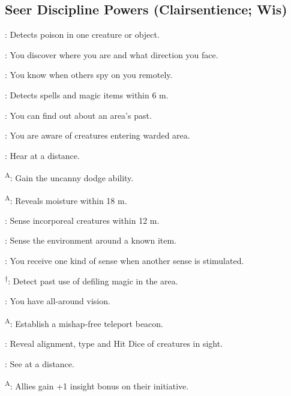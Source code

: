 \subsection{Seer Discipline Powers {\normalsize(Clairsentience; Wis)}}
\begin{enumerate*}
\item {}: Detects poison in one creature or object.

: You discover where you are and what direction you face.

: You know when others spy on you remotely.

\item {}: Detects spells and magic items within 6 m.

: You can find out about an area's past.

: You are aware of creatures entering warded area.

\item {}: Hear at a distance.

\textsuperscript{A}: Gain the uncanny dodge ability.

\textsuperscript{A}: Reveals moisture within 18 m.

: Sense incorporeal creatures within 12 m.

: Sense the environment around a known item.

: You receive one kind of sense when another sense is stimulated.

\textsuperscript{$\dagger$}: Detect past use of defiling magic in the area.

: You have all-around vision.

\item {}\textsuperscript{A}: Establish a mishap-free teleport beacon.

: Reveal alignment, type and Hit Dice of creatures in sight.

: See at a distance.

\textsuperscript{A}: Allies gain +1 insight bonus on their initiative.


\end{enumerate*}
